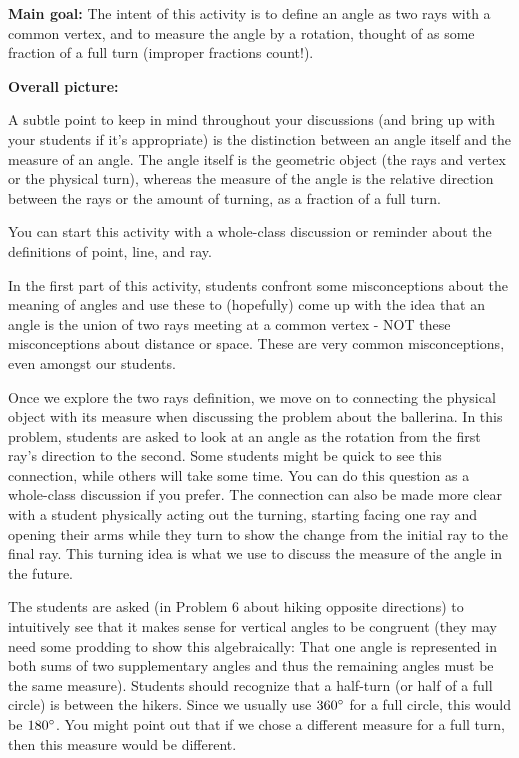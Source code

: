 \documentclass[nooutcomes,noauthor]{ximera}
\begin{document}
\begin{instructorNotes}

{\bf Main goal:}
The intent of this activity is to define an angle as two rays with a common vertex, and to measure the angle by a rotation, thought of as some fraction of a full turn (improper fractions count!).  



{\bf Overall picture:}

A subtle point to keep in mind throughout your discussions (and bring up with your students if it's appropriate) is the distinction between an angle itself and the measure of an angle. The angle itself is the geometric object (the rays and vertex or the physical turn), whereas the measure of the angle is the relative direction between the rays or the amount of turning, as a fraction of a full turn. 



You can start this activity with a whole-class discussion or reminder about the definitions of point, line, and ray.

In the first part of this activity, students confront some misconceptions about the meaning of angles and use these to (hopefully) come up with the idea that an angle is the union of two rays meeting at a common vertex - NOT these misconceptions about distance or space. These are very common misconceptions, even amongst our students.

    Once we explore the two rays definition, we move on to connecting the physical object with its measure when discussing  the problem about the ballerina. In this problem, students are asked to look at an angle as the rotation from the first ray’s direction to the second.  Some students might be quick to see this connection, while others will take some time. You can do this question as a whole-class discussion if you prefer. The connection can also be made more clear with a student physically acting out the turning, starting facing one ray and opening their arms while they turn to show the change from the initial ray to the final ray.  This turning idea is what we use to discuss the measure of the angle in the future.



 The students are asked (in Problem 6 about hiking opposite directions) to intuitively see that it makes sense for vertical angles to be congruent (they may need some prodding to show this algebraically:  That one angle is represented in both sums of two supplementary angles and thus the remaining angles must be the same measure). Students should recognize that a half-turn (or half of a full circle) is between the hikers.  Since we usually use $360\degree$ for a full circle, this would be $180\degree$.  You might point out that if we chose a different measure for a full turn, then this measure would be different.



\end{instructorNotes}
\end{document}
